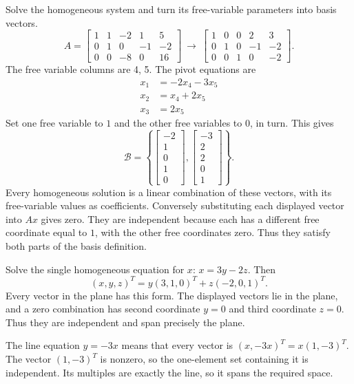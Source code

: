 \goal Solve the homogeneous system and turn its free-variable parameters into basis vectors.
\[A=\left[\begin{array}{rrrrr}1&1&-2&1&5\\0&1&0&-1&-2\\0&0&-8&0&16\end{array}\right]\ \longrightarrow\ \left[\begin{array}{rrrrr}1&0&0&2&3\\0&1&0&-1&-2\\0&0&1&0&-2\end{array}\right].\]
The free variable columns are 4, 5. The pivot equations are
\[\begin{aligned}x_{1}&=- 2 x_{4} - 3 x_{5}\\x_{2}&=x_{4} + 2 x_{5}\\x_{3}&=2 x_{5}\end{aligned}\]
Set one free variable to $1$ and the other free variables to $0$, in turn. This gives
\[\mathcal B=\left\{\left[\begin{array}{r}-2\\1\\0\\1\\0\end{array}\right],\left[\begin{array}{r}-3\\2\\2\\0\\1\end{array}\right]\right\}.\]
Every homogeneous solution is a linear combination of these vectors, with its free-variable values as coefficients. Conversely substituting each displayed vector into $Ax$ gives zero. They are independent because each has a different free coordinate equal to $1$, with the other free coordinates zero. Thus they satisfy both parts of the basis definition.

Solve the single homogeneous equation for $x$: $x=3y-2z$.
Then
\[
(x,y,z)^T=y(3,1,0)^T+z(-2,0,1)^T.
\]
Every vector in the plane has this form. The displayed vectors lie in
the plane, and a zero combination has second coordinate $y=0$ and third
coordinate $z=0$. Thus they are independent and span precisely the plane.

The line equation $y=-3x$ means that every vector is
$(x,-3x)^T=x(1,-3)^T$. The vector $(1,-3)^T$ is nonzero, so the
one-element set containing it is independent. Its multiples are exactly
the line, so it spans the required space.

